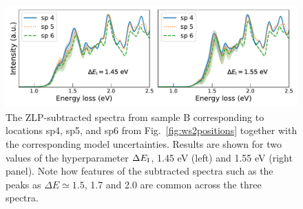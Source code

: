 \begin{figure}[H]
\begin{centering}
  \includegraphics[width=0.99\linewidth]{plots/subtracted_spectra_comp.pdf}
  \caption{The ZLP-subtracted spectra from sample B corresponding to locations sp4, sp5, and sp6
    from Fig.~\ref{fig:ws2positions} together with the corresponding model uncertainties.
    Results are shown for two values of the hyperparameter $\Delta E_{\rm I}$,
    1.45 eV (left) and 1.55 eV (right panel).
    Note how features of the subtracted spectra such as the peaks as $\Delta E\simeq 1.5$,
    1.7 and 2.0 are common across the three spectra.
  }
\label{fig:subtracted_spectra_comp}
\end{centering}
\end{figure}



